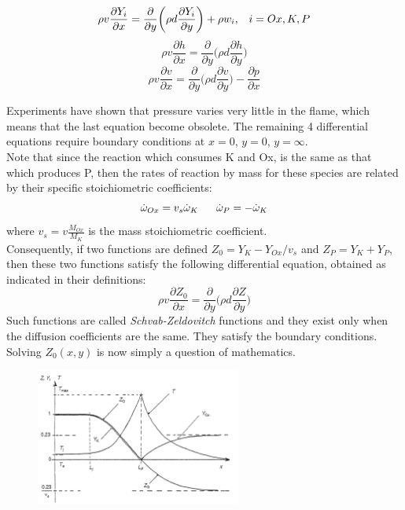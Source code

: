 \documentclass[12pt]{article}
\begin{document}
\begin{equation}
    \rho v\frac{\partial Y_{i}}{\partial x}=\frac{\partial}{\partial y}\bigg(\rho d \frac{\partial Y_{i}}{\partial y} \bigg) + \rho w_{i}, \text{\;}\text{\;}\text{\;} i=Ox, K, P
\end{equation}
\begin{equation}
    \rho v\frac{\partial h}{\partial x}=\frac{\partial}{\partial y}\bigg(\rho d \frac{\partial h}{\partial y} \bigg)
\end{equation}
\begin{equation}
    \rho v\frac{\partial v}{\partial x}=\frac{\partial}{\partial y}\bigg(\rho d \frac{\partial v}{\partial y} \bigg) - \frac{\partial p}{\partial x}
\end{equation}

Experiments have shown that pressure varies very little in the flame, which means that the last equation become obsolete. The remaining 4 differential equations require boundary conditions at $x=0$, $y=0$, $y=\infty$.\\
Note that since the reaction which consumes K and Ox, is the same as that which produces P, then the rates of reaction by mass for these species are related by their specific stoichiometric coefficients:
\begin{equation}
    \dot{\omega}_{Ox} = v_{s}\dot{\omega}_{K} \text{\;\;\;\;\;\;} \dot{\omega}_{P} = -\dot{\omega}_{K}
\end{equation}
where $v_{s}=v\frac{M_{Ox}}{M_{K}}$ is the mass stoichiometric coefficient.\\
Consequently, if two functions are defined $Z_{0}=Y_{K}-Y_{Ox}/v_{s}$ and $Z_{P} = Y_{K}+Y_{P}$, then these two functions satisfy the following differential equation, obtained as indicated in their definitions:
\begin{equation}
    \rho v\frac{\partial Z_{0}}{\partial x}=\frac{\partial}{\partial y}\bigg(\rho d \frac{\partial Z}{\partial y} \bigg)
\end{equation}
Such functions are called \textit{Schvab-Zeldovitch} functions and they exist only when the diffusion coefficients are the same. They satisfy the boundary conditions. Solving $Z_{0}(x,y)$ is now simply a question of mathematics.

\begin{figure}[!ht]
\centering
\includegraphics[width=0.6\textwidth]{figures/schumann.png}
\end{figure}
\end{document}

